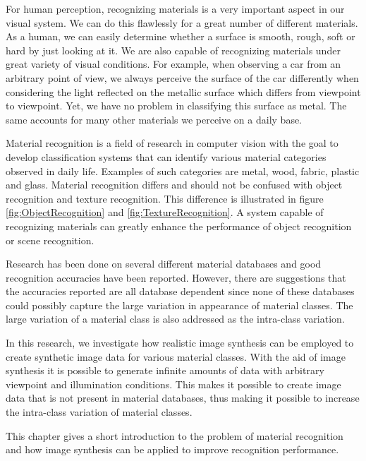 \hypertarget{Introduction}{
}

For human perception, recognizing materials is a very important aspect in our visual system. We can do this flawlessly for a great number of different materials. As a human, we can easily determine whether a surface is smooth, rough, soft or hard by just looking at it. We are also capable of recognizing  materials under great variety of visual conditions. For example, when observing a car from an arbitrary point of view, we always perceive the surface of the car differently when considering the light reflected on the metallic surface which differs from viewpoint to viewpoint. Yet, we have no problem in classifying this surface as metal. The same accounts for many other materials we perceive on a daily base.

Material recognition is a field of research in computer vision with the goal to develop classification systems that can identify various material categories observed in daily life. Examples of such categories are metal, wood, fabric, plastic and glass. Material recognition differs and should not be confused with object recognition and texture recognition. This difference is illustrated in figure \ref{fig:ObjectRecognition} and \ref{fig:TextureRecognition}. A system capable of recognizing materials can greatly enhance the performance of object recognition or scene recognition.

Research has been done on several different material databases and good recognition accuracies have been reported. However, there are suggestions that the accuracies reported are all database dependent \cite{ExploringFeatures} since none of these databases could possibly capture the large variation in appearance of material classes. The large variation of a material class is also addressed as the intra-class variation. 

In this research, we investigate how realistic image synthesis can be employed to create synthetic image data for various material classes. With the aid of image synthesis it is possible to generate infinite amounts of data with arbitrary viewpoint and illumination conditions. This makes it possible to create image data that is not present in material databases, thus making it possible to increase the intra-class variation of material classes.

This chapter gives a short introduction to the problem of material recognition and how image synthesis can be applied to improve recognition performance.

